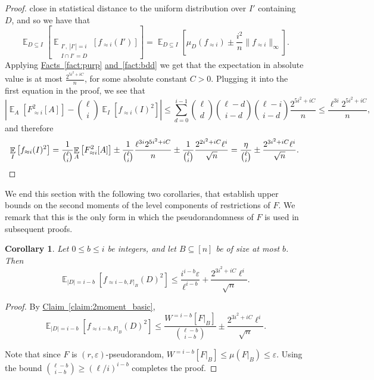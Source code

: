 \documentclass[11pt]{article}
\newcommand{\expref}[2]{\texorpdfstring{\hyperref[#2]{#1~\ref{#2}}}{#1~\ref{#2}}}
\newtheorem{corollary}[theorem]{Corollary}
\newcommand\card[1]{\left| {#1} \right|}
\newcommand\Expect[2]{{\mathop{\mathbb{E}}_{#1}\left[ {#2} \right]}}
\newcommand\norm[1]{\| #1 \|}
\newcommand\eps{\varepsilon}
\renewcommand\geq{\geqslant}
\renewcommand\leq{\leqslant}
\newcommand\approxlvlfn[2]{{#1}_{\approx{#2}}}
\begin{document}
\begin{proof}
close in statistical distance to the uniform distribution over $I'$ containing $D$, and so we have that
\[
\Expect{D\subseteq I}{\Expect{\substack{I', ~\card{I'} = i\\ I\cap I'=D}}{
\approxlvlfn{f}{i}(I')}}
=
\Expect{D\subseteq I}{\mu_D(\approxlvlfn{f}{i})\pm \frac{i^2}{n}\norm{\approxlvlfn{f}{i}}_{\infty}}.
\]
Applying \expref{Facts}{fact:purp} \expref{and}{fact:bdd}
we get that the expectation in absolute value is at most $\frac{2^{5i^2 + iC}}{n}$, for some absolute constant $C>0$.
Plugging it into the first equation in the proof, we see that
\[
\card{
\Expect{A}{\approxlvlfn{F}{i}^2[A]}
-
{\ell \choose i}\Expect{I}{\approxlvlfn{f}{i}(I)^2}
}
\leq \sum\limits_{d=0}^{i-1}{
{\ell \choose d}{\ell - d \choose i-d}{\ell - i \choose i-d}
\frac{2^{5i^2+iC}}{n}}
\leq \frac{\ell^{3i} 2^{5i^2+iC}}{n},
\]
and therefore
\[
\Expect{I}{\approxlvlfn{f}{i}(I)^2}
=\frac{1}{{\ell\choose i}} \Expect{A}{\approxlvlfn{F}{i}^2[A]}
\pm \frac{1}{{\ell\choose i}} \frac{\ell^{3i} 2^{5i^2+iC}}{n}
\pm \frac{1}{{\ell\choose i}} \frac{2^{2i^2+iC} \ell^{i}}{\sqrt{n}}
=\frac{\eta}{{\ell\choose i}}
\pm \frac{2^{3i^2+iC} \ell^{i}}{\sqrt{n}}.
\qedhere           %
\]
\end{proof}



We end this section with the following two corollaries, that establish upper bounds on the
second moments of the level components of restrictions of $F$. We remark that this
is the only form in which the pseudorandomness of $F$ is used in subsequent proofs.
\begin{corollary}\label{corr:rest_basic}
Let $0\leq b\leq i$ be integers, and let $B\subseteq [n]$ be of size at most $b$. Then
\[
\Expect{\card{D} = i-b}{\approxlvlfn{f}{i-b, F|_B}(D)^2}
\leq \frac{i^{i-b} \eps }{\ell^{i-b}} + \frac{2^{3i^2+iC} \ell^{i}}{\sqrt{n}}.
\]
\end{corollary}
\begin{proof}
By \expref{Claim}{claim:2moment_basic},
\[
\Expect{\card{D} = i-b}{\approxlvlfn{f}{i-b, F|_B}(D)^2}
\leq \frac{W^{=i-b}[F|_B]}{{\ell - b \choose i-b}}\pm \frac{2^{3i^2+iC} \ell^{i}}{\sqrt{n}}.
\]

Note that since $F$ is $(r,\eps)$-pseudorandom, $W^{=i-b}[F|_B] \leq \mu(F|_B) \leq\eps$.
Using the bound ${\ell-b \choose i-b}\geq (\ell/i)^{i-b}$ completes the proof.
\end{proof}
\end{document}
